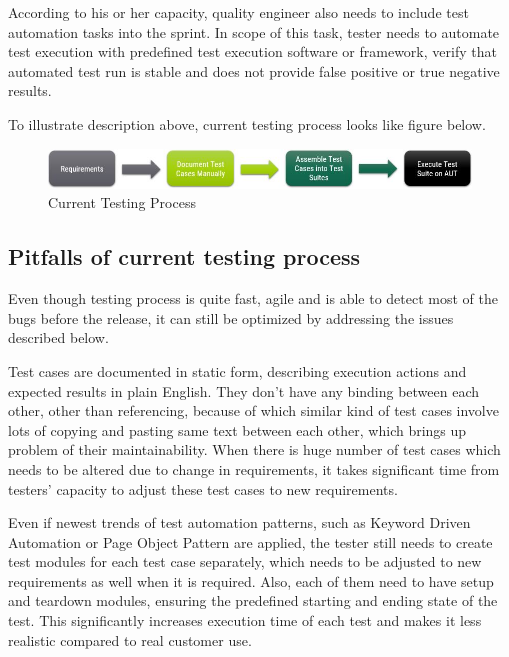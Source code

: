 \par
According to his or her capacity, quality engineer also needs to include test automation tasks into the sprint. In scope of this task, tester needs to automate test execution with predefined test execution software or framework, verify that automated test run is stable and does not provide false positive or true negative results.

\par
To illustrate description above, current testing process looks like figure below.

\begin{figure} [htbp!]
	\centering
					\includegraphics[width=1\textwidth]{figures/current_testing_process_flow.JPG}
					\caption{\label{Fig:current_testing_process_flow} Current Testing Process}
\end{figure}

\subsection{Pitfalls of current testing process}
\par
Even though testing process is quite fast, agile and is able to detect most of the bugs before the release, it can still be optimized by addressing the issues described below.

\par
Test cases are documented in static form, describing execution actions and expected results in plain English. They don't have any binding between each other, other than referencing, because of which similar kind of test cases involve lots of copying and pasting same text between each other, which brings up problem of their maintainability. When there is huge number of test cases which needs to be altered due to change in requirements, it takes significant time from testers' capacity to adjust these test cases to new requirements.

\par
Even if newest trends of test automation patterns, such as Keyword Driven Automation or Page Object Pattern are applied, the tester still needs to create test modules for each test case separately, which needs to be adjusted to new requirements as well when it is required. Also, each of them need to have setup and teardown modules, ensuring the predefined starting and ending state of the test. This significantly increases execution time of each test and makes it less realistic compared to real customer use.

